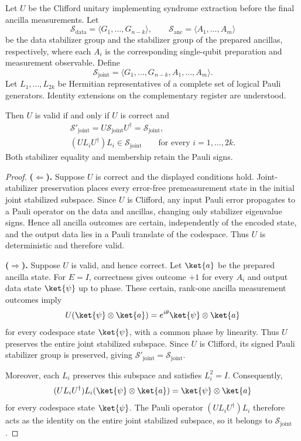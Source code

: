 \begin{theorem}
\label{thm:syndrome-extraction-valid}
Let $U$ be the Clifford unitary implementing syndrome extraction
before the final ancilla measurements. Let
\[
    \mathcal{S}_{\mathrm{data}}
    =\langle G_1,\ldots,G_{n-k}\rangle,
    \qquad
    \mathcal{S}_{\mathrm{anc}}
    =\langle A_1,\ldots,A_m\rangle
\]
be the data stabilizer group and the stabilizer group of the
prepared ancillas, respectively, where each $A_i$ is the
corresponding single-qubit preparation and measurement observable.
Define
\[
    \mathcal{S}_{\mathrm{joint}}
    =\langle G_1,\ldots,G_{n-k},A_1,\ldots,A_m\rangle.
\]
Let $L_1,\ldots,L_{2k}$ be Hermitian representatives of a complete
set of logical Pauli generators. Identity extensions on the
complementary register are understood.

Then $U$ is valid if and only if $U$ is correct and
\[
\begin{gathered}
    \mathcal{S}'_{\mathrm{joint}}
    =U\mathcal{S}_{\mathrm{joint}}U^\dagger
    =\mathcal{S}_{\mathrm{joint}},
    \\
    (UL_iU^\dagger)L_i\in\mathcal{S}_{\mathrm{joint}}
    \qquad\text{for every }i=1,\ldots,2k.
\end{gathered}
\]
Both stabilizer equality and membership retain the Pauli signs.
\end{theorem}

\begin{proof}
\textbf{($\Leftarrow$).}
Suppose $U$ is correct and the displayed conditions hold.
Joint-stabilizer preservation places every error-free
premeasurement state in the initial joint stabilized subspace.
Since $U$ is Clifford, any input Pauli error propagates to a
Pauli operator on the data and ancillas, changing only stabilizer
eigenvalue signs. Hence all ancilla outcomes are certain,
independently of the encoded state, and the output data lies in
a Pauli translate of the codespace. Thus $U$ is deterministic
and therefore valid.

\textbf{($\Rightarrow$).}
Suppose $U$ is valid, and hence correct. Let $\ket{a}$ be the
prepared ancilla state. For $E=I$, correctness gives outcome
$+1$ for every $A_i$ and output data state $\ket{\psi}$ up to
phase. These certain, rank-one ancilla measurement outcomes imply
\[
    U(\ket{\psi}\otimes\ket{a})
    =e^{i\theta}\ket{\psi}\otimes\ket{a}
\]
for every codespace state $\ket{\psi}$, with a common phase by
linearity. Thus $U$ preserves the entire joint stabilized subspace.
Since $U$ is Clifford, its signed Pauli stabilizer group is
preserved, giving
$\mathcal{S}'_{\mathrm{joint}}=\mathcal{S}_{\mathrm{joint}}$.

Moreover, each $L_i$ preserves this subspace and satisfies
$L_i^2=I$. Consequently,
\[
    (UL_iU^\dagger)L_i(\ket{\psi}\otimes\ket{a})
    =\ket{\psi}\otimes\ket{a}
\]
for every codespace state $\ket{\psi}$. The Pauli operator
$(UL_iU^\dagger)L_i$ therefore acts as the identity on the entire
joint stabilized subspace, so it belongs to
$\mathcal{S}_{\mathrm{joint}}$.
\end{proof}

